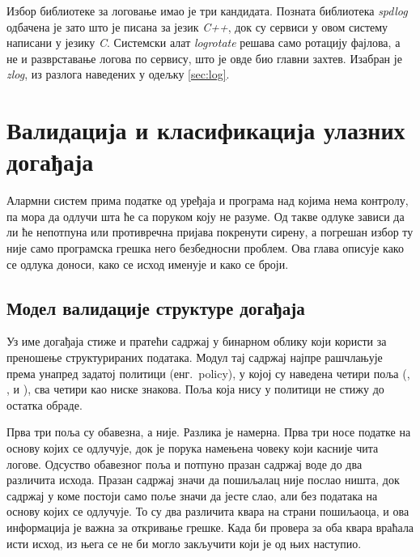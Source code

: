 \documentclass[12pt,oneside]{memoir}
\begin{document}
Избор библиотеке за логовање имао је три кандидата. Позната библиотека \emph{spdlog}
одбачена је зато што је писана за језик \emph{C++}, док су сервиси у овом систему написани у
језику \emph{C}. Системски алат \emph{logrotate} решава само ротацију фајлова, а не и
разврставање логова по сервису, што је овде био главни захтев. Изабран је \emph{zlog}, из
разлога наведених у одељку \ref{sec:log}.

\chapter{Валидација и класификација улазних догађаја}
\label{chp:validacija}
Алармни систем прима податке од уређаја и програма над којима нема контролу, па мора да
одлучи шта ће са поруком коју не разуме. Од такве одлуке зависи да ли ће непотпуна или
противречна пријава покренути сирену, а погрешан избор ту није само програмска грешка него
безбедносни проблем. Ова глава описује како се одлука доноси, како се исход именује и како
се броји.

\section{Модел валидације структуре догађаја}
\label{sec:validacija-model}

Уз име догађаја стиже и пратећи садржај у бинарном облику који  користи за
преношење структурираних података. Модул  тај садржај најпре
рашчлањује према унапред задатој политици (енг.\ policy), у којој су наведена четири поља (,
,  и ), сва четири као ниске знакова. Поља која
нису у политици не стижу до остатка обраде.

Прва три поља су обавезна, а  није. Разлика је намерна. Прва три носе податке
на основу којих се одлучује, док је порука намењена човеку који касније чита логове.
Одсуство обавезног поља и потпуно празан садржај воде до два различита исхода. Празан
садржај значи да пошиљалац
није послао ништа, док садржај у коме постоји само поље  значи да јесте слао, али без података 
на основу којих се одлучује. То су два различита квара на страни пошиљаоца, и ова информација 
је важна за откривање грешке. Када би провера за оба квара враћала исти исход, из њега се не
би могло закључити који је од њих наступио.
\end{document}
